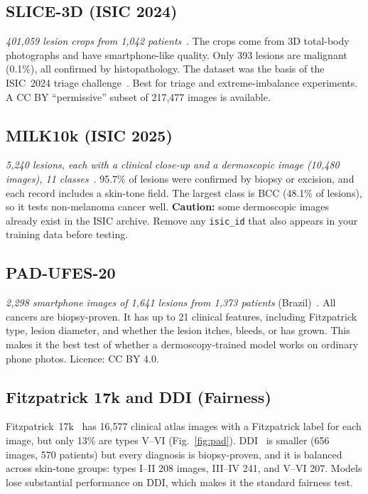 \documentclass[10pt,a4paper]{article}
\begin{document}
\subsection{SLICE-3D (ISIC 2024)}
\emph{401{,}059 lesion crops from 1{,}042 patients}~\cite{kurtansky2024slice3d}.
The crops come from 3D total-body photographs and have smartphone-like
quality. Only 393 lesions are malignant (0.1\%), all confirmed by
histopathology. The dataset was the basis of the ISIC~2024 triage
challenge~\cite{kurtansky2025}. Best for triage and extreme-imbalance
experiments. A CC BY ``permissive'' subset of 217{,}477 images is
available.

\subsection{MILK10k (ISIC 2025)}
\emph{5{,}240 lesions, each with a clinical close-up and a dermoscopic
image (10{,}480 images), 11 classes}~\cite{tschandl2026milk10k}.
95.7\% of lesions were confirmed by biopsy or excision, and each record
includes a skin-tone field. The largest class is BCC (48.1\% of
lesions), so it tests non-melanoma cancer well. \textbf{Caution:} some
dermoscopic images already exist in the ISIC archive. Remove any
\texttt{isic\_id} that also appears in your training data before
testing.

\subsection{PAD-UFES-20}
\emph{2{,}298 smartphone images of 1{,}641 lesions from 1{,}373 patients}
(Brazil)~\cite{pacheco2020padufes20}. All cancers are
biopsy-proven. It has up to 21 clinical features, including Fitzpatrick
type, lesion diameter, and whether the lesion itches, bleeds, or has
grown. This makes it the best test of whether a dermoscopy-trained model
works on ordinary phone photos. Licence: CC BY 4.0.

\subsection{Fitzpatrick 17k and DDI (Fairness)}
Fitzpatrick~17k~\cite{groh2021fitzpatrick17k} has 16{,}577 clinical
atlas images with a Fitzpatrick label for each image, but only 13\% are
types V--VI (Fig.~\ref{fig:pad}). DDI~\cite{daneshjou2022ddi} is
smaller (656 images, 570 patients) but every diagnosis is biopsy-proven,
and it is balanced across skin-tone groups: types I--II 208 images,
III--IV 241, and V--VI 207. Models lose substantial performance on DDI,
which makes it the standard fairness test.
\end{document}
